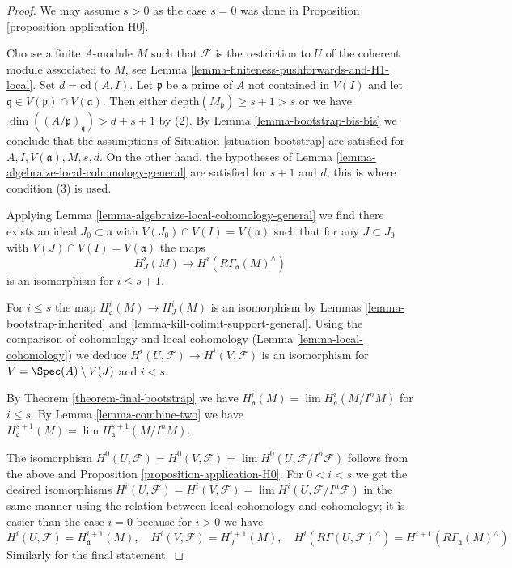 \begin{proof}
We may assume $s > 0$ as the case $s = 0$ was done in
Proposition \ref{proposition-application-H0}.

\medskip\noindent
Choose a finite $A$-module $M$ such that $\mathcal{F}$ is the restriction
to $U$ of the coherent module associated to $M$, see
Lemma \ref{lemma-finiteness-pushforwards-and-H1-local}.
Set $d = \text{cd}(A, I)$.
Let $\mathfrak p$ be a prime of $A$ not contained in $V(I)$
and let $\mathfrak q \in V(\mathfrak p) \cap V(\mathfrak a)$.
Then either $\text{depth}(M_\mathfrak p) \geq s + 1 > s$
or we have $\dim((A/\mathfrak p)_\mathfrak q) > d + s + 1$ by (2).
By Lemma \ref{lemma-bootstrap-bis-bis} we conclude that the
assumptions of Situation \ref{situation-bootstrap}
are satisfied for $A, I, V(\mathfrak a), M, s, d$.
On the other hand, the hypotheses of
Lemma \ref{lemma-algebraize-local-cohomology-general}
are satisfied for $s + 1$ and $d$; this is where condition (3) is used.

\medskip\noindent
Applying Lemma \ref{lemma-algebraize-local-cohomology-general}
we find there exists an ideal
$J_0 \subset \mathfrak a$ with $V(J_0) \cap V(I) = V(\mathfrak a)$
such that for any $J \subset J_0$ with $V(J) \cap V(I) = V(\mathfrak a)$
the maps
$$
H^i_J(M) \longrightarrow H^i(R\Gamma_\mathfrak a(M)^\wedge)
$$
is an isomorphism for $i \leq s + 1$.

\medskip\noindent
For $i \leq s$ the map $H^i_\mathfrak a(M) \to H^i_J(M)$
is an isomorphism by Lemmas \ref{lemma-bootstrap-inherited} and
\ref{lemma-kill-colimit-support-general}.
Using the comparison of cohomology and local cohomology
(Lemma \ref{lemma-local-cohomology}) we deduce
$H^i(U, \mathcal{F}) \to H^i(V,\mathcal{F})$
is an isomorphism for $V = \Spec(A) \setminus V(J)$ and
$i < s$.

\medskip\noindent
By Theorem \ref{theorem-final-bootstrap} we have
$H^i_\mathfrak a(M) = \lim H^i_\mathfrak a(M/I^nM)$
for $i \leq s$. By Lemma \ref{lemma-combine-two} we have
$H^{s + 1}_\mathfrak a(M) = \lim H^{s + 1}_\mathfrak a(M/I^nM)$.

\medskip\noindent
The isomorphism $H^0(U, \mathcal{F}) = H^0(V, \mathcal{F}) =
\lim H^0(U, \mathcal{F}/I^n\mathcal{F})$ follows from the above and
Proposition \ref{proposition-application-H0}.
For $0 < i < s$ we get the desired isomorphisms
$H^i(U, \mathcal{F}) = H^i(V, \mathcal{F}) =
\lim H^i(U, \mathcal{F}/I^n\mathcal{F})$ in
the same manner using the relation between local cohomology
and cohomology; it is easier than the case $i = 0$
because for $i > 0$ we have
$$
H^i(U, \mathcal{F}) = H^{i + 1}_\mathfrak a(M),
\quad
H^i(V, \mathcal{F}) = H^{i + 1}_J(M),
\quad
H^i(R\Gamma(U, \mathcal{F})^\wedge) = 
H^{i + 1}(R\Gamma_\mathfrak a(M)^\wedge)
$$
Similarly for the final statement.
\end{proof}





